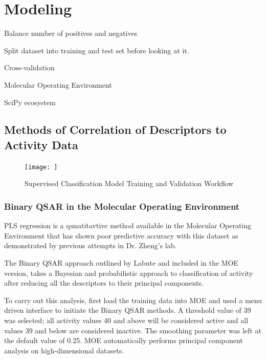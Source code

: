 \section{Modeling}
\begin{description}
\item Balance number of positives and negatives

\item Split dataset into training and test set before looking at it.

\item Cross-validation
\end{description}

\begin{description}
\item Molecular Operating Environment
\item SciPy ecosystem

\end{description}

\subsection{Methods of Correlation of Descriptors to Activity Data}

\begin{figure}[h,t]
  \caption{Supervised Classification Model Training and Validation Workflow}
  \centering
   \texttt{[image: ]}
\end{figure}

\subsubsection{Binary QSAR in the Molecular Operating Environment}
PLS regression is a qunatitavtive method available in the Molecular Operating Environment that has shown poor predictive accuracy with this dataset as demonstrated by previous attempts in Dr. Zheng's lab.

The Binary QSAR approach outlined by Labute \cite{Labute2001} and included in the MOE version, takes a Bayesian and probabilistic approach to classification of activity after reducing all the descriptors to their principal components.

To carry out this analysis, first load the training data into MOE and used a menu driven interface to initiate the Binary QSAR methods. A threshold value of 39 was selected; all activity values 40 and above will be considered active and all values 39 and below are considered inactive. The smoothing parameter was left at the default value of 0.25. MOE automatically performs principal component analysis on high-dimensional datasets.

